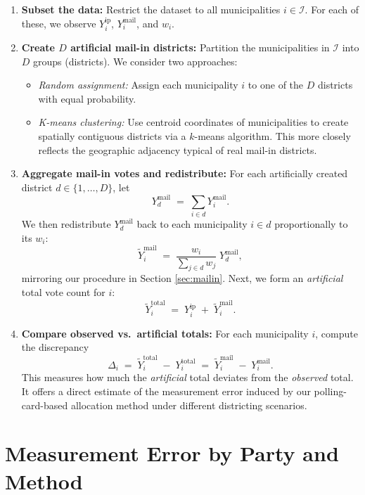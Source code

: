 \documentclass[12pt]{article}
\newcommand{\ip}{\text{ip}}
\newcommand{\mail}{\text{mail}}
\newcommand{\total}{\text{total}}
\begin{document}
\begin{enumerate}
    \item \textbf{Subset the data:} Restrict the dataset to all municipalities $i \in \mathcal{I}$. For each of these, we observe $Y_i^{\ip}$, $Y_i^{\mail}$, and $w_i$.

    \item \textbf{Create $D$ artificial mail-in districts:} Partition the municipalities in $\mathcal{I}$ into $D$ groups (districts). We consider two approaches:
    \begin{itemize}
        \item \textit{Random assignment:} Assign each municipality $i$ to one of the $D$ districts with equal probability.
        \item \textit{K-means clustering:} Use centroid coordinates of municipalities to create spatially contiguous districts via a $k$-means algorithm. This more closely reflects the geographic adjacency typical of real mail-in districts.
    \end{itemize}

    \item \textbf{Aggregate mail-in votes and redistribute:} For each artificially created district $d \in \{1,\dots,D\}$, let
    \[
        Y_d^{\mail} \;=\; \sum_{i \in d} Y_i^{\mail}.
    \]
    We then redistribute $Y_d^{\mail}$ back to each municipality $i \in d$ proportionally to its $w_i$:
    \[
        \widetilde{Y}_i^{\mail} 
        \;=\; 
        \frac{w_i}{\sum_{j \in d} w_j} 
        \; Y_d^{\mail},
    \]
    mirroring our procedure in Section \ref{sec:mailin}. Next, we form an \emph{artificial} total vote count for $i$:
    \[
        \widetilde{Y}_i^{\total} 
        \;=\; 
        Y_i^{\ip} 
        \;+\;
        \widetilde{Y}_i^{\mail}.
    \]

    \item \textbf{Compare observed vs.\ artificial totals:} For each municipality $i$, compute the discrepancy
    \[
        \Delta_i 
        \;=\; 
        \widetilde{Y}_i^{\total}
        \;-\; 
        Y_i^{\total}
        \;=\;
        \widetilde{Y}_i^{\mail} \;-\; Y_i^{\mail}.
    \]
    This measures how much the \emph{artificial} total deviates from the \emph{observed} total. It offers a direct estimate of the measurement error induced by our polling-card-based allocation method under different districting scenarios.
\end{enumerate}

\section{Measurement Error by Party and Method}
\end{document}
